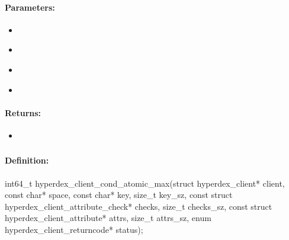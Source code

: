 \paragraph{Parameters:}
\begin{itemize}[noitemsep]
\item {}\\

\item {}\\

\item {}\\

\item {}\\

\end{itemize}

\paragraph{Returns:}
\begin{itemize}[noitemsep]
\item {}\\

\end{itemize}

\pagebreak
\subsubsection{}
\label{api:c:cond_atomic_max}


\paragraph{Definition:}
\begin{ccode}
int64_t hyperdex_client_cond_atomic_max(struct hyperdex_client* client,
        const char* space,
        const char* key, size_t key_sz,
        const struct hyperdex_client_attribute_check* checks, size_t checks_sz,
        const struct hyperdex_client_attribute* attrs, size_t attrs_sz,
        enum hyperdex_client_returncode* status);
\end{ccode}

